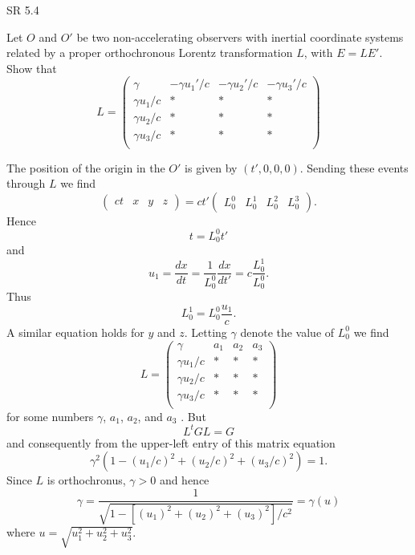 \documentclass[minion]{homework}
\begin{document}
\begin{aproblems}

\hproblem SR 5.4

Let $O$ and $O'$ be two non-accelerating observers with inertial coordinate systems related
by a proper orthochronous Lorentz transformation $L$, with $E = L E'$. Show that
\begin{equation}
L = \begin{pmatrix} \gamma & -\gamma u_1'/c & -\gamma u_2'/c  & -\gamma u_3'/c\\
\gamma u_1/c &  * & * & *  \\
\gamma u_2/c &  * & * & *  \\
\gamma u_3/c &  * & * & *  \\
\end{pmatrix}
\end{equation}

\solution
The position of the origin in the $O'$ is given by $(t', 0, 0, 0)$.  Sending these events
through $L$ we find
\begin{equation}
\begin{pmatrix} ct & x & y & z \end{pmatrix} = ct' \begin{pmatrix} L^0_0 & L^1_0 & L^2_0 & L^3_0 \end{pmatrix}.
\end{equation}
Hence
\begin{equation}
t = L^0_0 t'
\end{equation}
and
\begin{equation}
u_1=\frac{dx}{dt} = \frac{1}{L^0_0} \frac{dx}{dt'} = c\frac{L^1_0}{L^0_0}.
\end{equation}
Thus 
\begin{equation}
L^{1}_0 = L^{0}_0 \frac{u_1}{c}.
\end{equation}
A similar equation holds for $y$ and $z$. Letting $\gamma$ denote the value of $L^0_0$
we find
\begin{equation}
L = \begin{pmatrix} \gamma & a_1 & a_2 & a_3 \\
\gamma u_1/c &  * & * & *  \\
\gamma u_2/c &  * & * & *  \\
\gamma u_3/c &  * & * & *  \\
\end{pmatrix}
\end{equation}
for some numbers $\gamma$, $a_1$, $a_2$, and $a_3$ .  But
\begin{equation}
L^t G L = G
\end{equation}
and consequently from the upper-left entry of this matrix equation
\begin{equation}
\gamma^2 (1- (u_1/c)^2 + (u_2/c)^2 + (u_3/c)^2) = 1.
\end{equation}
Since $L$ is orthochronus, $\gamma>0$ and hence
\begin{equation}
\gamma = \frac{1}{\sqrt{1- [(u_1)^2 + (u_2)^2 + (u_3)^2]/c^2}}=\gamma(u)
\end{equation}
where $u=\sqrt{u_1^2+u_2^2+u_3^2}$.


\end{aproblems}
\end{document}
